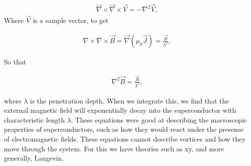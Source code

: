 \begin{eqnarray}
\overrightarrow \nabla \times \overrightarrow \nabla \times \overrightarrow V  = -\nabla^2 \overrightarrow V,
\label{stokes}
\end{eqnarray}
Where $\overrightarrow V$ is a sample vector, to get

\begin{eqnarray}
\nabla \times \nabla \times \overrightarrow B = \overrightarrow  \nabla (\mu_0 \overrightarrow J) = \frac{\overrightarrow B}{\lambda^2} ,
\label{midstep}
\end{eqnarray}

So that

\begin{eqnarray}
\nabla^2 \overrightarrow B = \frac{\overrightarrow B}{\lambda^2},
\label{penetration}
\end{eqnarray}

where $\lambda$ is the penetration depth. When we integrate this, we find that the external magnetic field will exponentially decay into the superconductor with characteristic length $\lambda$. These equations were good at describing the macroscopic properties of superconductors, such as how they would react under the presense of electromagnetic fields. These equations cannot describe vortices and how they move through the system. For this we have theories such as xy, and more generally, Langevin. 

